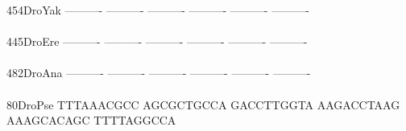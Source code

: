 \documentclass[11pt,twoside,reqno,a4paper]{article}
\begin{document}
{454\hspace*{2\charwidth}DroYak	----------	----------	----------	----------	----------	----------	\\
\hspace*{5\charwidth}\hspace*{7\charwidth}\hspace*{1\charwidth}\hspace*{1\charwidth}\hspace*{1\charwidth}\hspace*{1\charwidth}\hspace*{1\charwidth}\hspace*{1\charwidth}\\
445\hspace*{2\charwidth}DroEre	----------	----------	----------	----------	----------	----------	\\
\hspace*{5\charwidth}\hspace*{7\charwidth}\hspace*{1\charwidth}\hspace*{1\charwidth}\hspace*{1\charwidth}\hspace*{1\charwidth}\hspace*{1\charwidth}\hspace*{1\charwidth}\\
482\hspace*{2\charwidth}DroAna	----------	----------	----------	----------	----------	----------	\\
\hspace*{5\charwidth}\hspace*{7\charwidth}\hspace*{1\charwidth}\hspace*{1\charwidth}\hspace*{1\charwidth}\hspace*{1\charwidth}\hspace*{1\charwidth}\hspace*{1\charwidth}\\
80\hspace*{3\charwidth}DroPse	TTTAAACGCC	AGCGCTGCCA	GACCTTGGTA	AAGACCTAAG	AAAGCACAGC	TTTTAGGCCA	\\
\hspace*{5\charwidth}\hspace*{7\charwidth}\hspace*{1\charwidth}\hspace*{1\charwidth}\hspace*{1\charwidth}\hspace*{1\charwidth}\hspace*{1\charwidth}\hspace*{1\charwidth}\\
}
\end{document}
